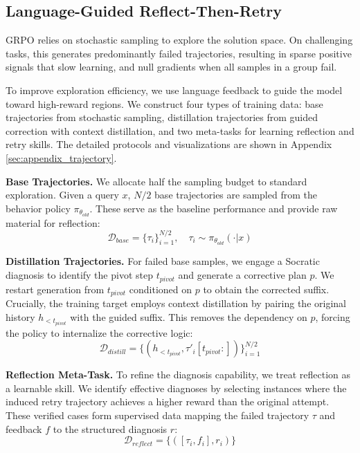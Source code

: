\documentclass[11pt]{article}
\begin{document}
\subsection{Language-Guided Reflect-Then-Retry}
GRPO relies on stochastic sampling to explore the solution space. On challenging tasks, this generates predominantly failed trajectories, resulting in sparse positive signals that slow learning, and null gradients when all samples in a group fail.

To improve exploration efficiency, we use language feedback to guide the model toward high-reward regions. We construct four types of training data: base trajectories from stochastic sampling, distillation trajectories from guided correction with context distillation, and two meta-tasks for learning reflection and retry skills. The detailed protocols and visualizations are shown in Appendix \ref{sec:appendix_trajectory}.

\textbf{Base Trajectories.} We allocate half the sampling budget to standard exploration. Given a query $x$, $N/2$ base trajectories are sampled from the behavior policy $\pi_{\theta_{old}}$. These serve as the baseline performance and provide raw material for reflection:
\begin{equation}
    \mathcal{D}_{base} = \{\tau_i\}_{i=1}^{N/2}, \quad \tau_i \sim \pi_{\theta_{old}}(\cdot | x)
\end{equation}

\textbf{Distillation Trajectories.} For failed base samples, we engage a Socratic diagnosis to identify the pivot step $t_{pivot}$ and generate a corrective plan $p$. We restart generation from $t_{pivot}$ conditioned on $p$ to obtain the corrected suffix. Crucially, the training target employs context distillation by pairing the original history $h_{<t_{pivot}}$ with the guided suffix. This removes the dependency on $p$, forcing the policy to internalize the corrective logic:
\begin{equation}
    \mathcal{D}_{distill} = \{(h_{<t_{pivot}}, \tau'_i[t_{pivot}:])\}_{i=1}^{N/2}
\end{equation}

\textbf{Reflection Meta-Task.} To refine the diagnosis capability, we treat reflection as a learnable skill. We identify effective diagnoses by selecting instances where the induced retry trajectory achieves a higher reward than the original attempt. These verified cases form supervised data mapping the failed trajectory $\tau$ and feedback $f$ to the structured diagnosis $r$:
\begin{equation}
    \mathcal{D}_{reflect} = \{([\tau_i, f_i], r_i)\}
\end{equation}
\end{document}
